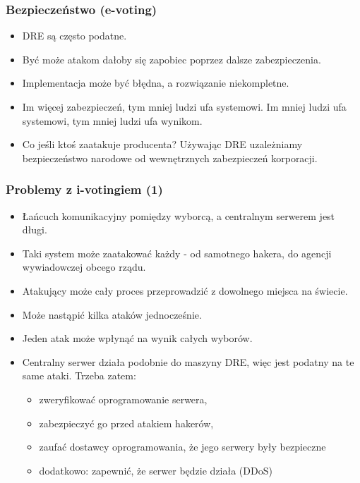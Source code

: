 \documentclass{beamer}
\begin{document}
\begin{frame}
\frametitle{Bezpieczeństwo (e-voting)}
\begin{itemize}
\item DRE są często podatne.\pause
\item Być może atakom dałoby się zapobiec poprzez dalsze zabezpieczenia.\pause
\item Implementacja może być błędna, a rozwiązanie niekompletne.\pause
\item Im więcej zabezpieczeń, tym mniej ludzi ufa systemowi. Im mniej ludzi ufa systemowi, tym mniej ludzi ufa wynikom.\pause
\item Co jeśli ktoś zaatakuje producenta? Używając DRE uzależniamy bezpieczeństwo narodowe od wewnętrznych zabezpieczeń korporacji.
\end{itemize}
\end{frame}

\begin{frame}
\frametitle{Problemy z i-votingiem (1)}\pause
\begin{itemize}
\item Łańcuch komunikacyjny pomiędzy wyborcą, a centralnym serwerem jest długi.\pause
\item Taki system może zaatakować każdy - od samotnego hakera, do agencji wywiadowczej obcego rządu.\pause
\item Atakujący może cały proces przeprowadzić z dowolnego miejsca na świecie.\pause
\item Może nastąpić kilka ataków jednocześnie. \pause
\item Jeden atak może wpłynąć na wynik całych wyborów.\pause
\item Centralny serwer działa podobnie do maszyny DRE, więc jest podatny na te same ataki. Trzeba zatem:\pause
\begin{itemize}
\item zweryfikować oprogramowanie serwera,\pause
\item zabezpieczyć go przed atakiem hakerów,\pause
\item zaufać dostawcy oprogramowania, że jego serwery były bezpieczne\pause
\item dodatkowo: zapewnić, że serwer będzie działa (DDoS)
\end{itemize}
\end{itemize}
\end{frame}
\end{document}
